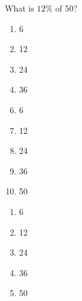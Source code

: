 


   What is $12\%$ of 50?


\ifsat
	\begin{enumerate}[label=\Alph*)]
		\item   6%
		\item  12
		\item  24
		\item  36
	\end{enumerate}
\else
\fi

\ifacteven
	\begin{enumerate}[label=\textbf{\Alph*.},itemsep=\fill,align=left]
		\setcounter{enumii}{5}
		\item   6%
		\item  12
		\item  24
		\addtocounter{enumii}{1}
		\item  36
		\item  50
	\end{enumerate}
\else
\fi

\ifactodd
	\begin{enumerate}[label=\textbf{\Alph*.},itemsep=\fill,align=left]
		\item   6%
		\item  12
		\item  24
		\item  36
		\item  50
	\end{enumerate}
\else
\fi

%
		
\else
\fi

